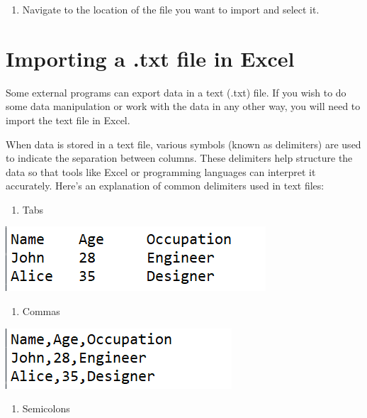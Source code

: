 \documentclass[
]{book}
\providecommand{\tightlist}{%
  \setlength{\itemsep}{0pt}\setlength{\parskip}{0pt}}
\begin{document}
\begin{enumerate}
\def\labelenumi{\arabic{enumi}.}
\setcounter{enumi}{3}
\tightlist
\item
  Navigate to the location of the file you want to import and select it.
\end{enumerate}

\section{Importing a .txt file in Excel}\label{importing-a-.txt-file-in-excel}

Some external programs can export data in a text (.txt) file. If you wish to do some data manipulation or work with the data in any other way, you will need to import the text file in Excel.

When data is stored in a text file, various symbols (known as delimiters) are used to indicate the separation between columns. These delimiters help structure the data so that tools like Excel or programming languages can interpret it accurately. Here's an explanation of common delimiters used in text files:

\begin{enumerate}
\def\labelenumi{\arabic{enumi}.}
\tightlist
\item
  Tabs
\end{enumerate}

\begin{center}\includegraphics[width=0.3\linewidth]{Figures/import_tabs} \end{center}

\begin{enumerate}
\def\labelenumi{\arabic{enumi}.}
\setcounter{enumi}{1}
\tightlist
\item
  Commas
\end{enumerate}

\begin{center}\includegraphics[width=0.3\linewidth]{Figures/import_commas} \end{center}

\begin{enumerate}
\def\labelenumi{\arabic{enumi}.}
\setcounter{enumi}{2}
\tightlist
\item
  Semicolons
\end{enumerate}
\end{document}
